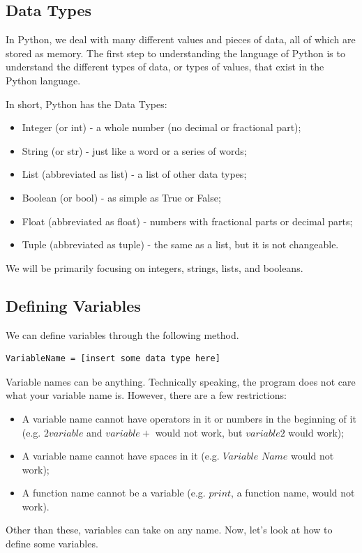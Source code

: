 \documentclass{article}
\begin{document}
\subsection{Data Types}
In Python, we deal with many different values and pieces of data, all of which are stored as memory. The first step to understanding the language of Python is to understand the different types of data, or types of values, that exist in the Python language. 

In short, Python has the Data Types:
\begin{itemize}
    \item Integer (or int) - a whole number (no decimal or fractional part);
    \item String (or str) - just like a word or a series of words;
    \item List (abbreviated as list) - a list of other data types;
    \item Boolean (or bool) - as simple as True or False;
    \item Float (abbreviated as float) - numbers with fractional parts or decimal parts;
    \item Tuple (abbreviated as tuple) - the same as a list, but it is not changeable.
\end{itemize}
We will be primarily focusing on integers, strings, lists, and booleans.
\subsection{Defining Variables}
We can define variables through the following method. 
\begin{lstlisting}
VariableName = [insert some data type here]
\end{lstlisting}
Variable names can be anything. Technically speaking, the program does not care what your variable name is. However, there are a few restrictions:

\begin{itemize}
    \item A variable name cannot have operators in it or numbers in the beginning of it (e.g. $2variable$ and $variable+$ would not work, but $variable2$ would work);
    \item A variable name cannot have spaces in it (e.g. $Variable$ $Name$ would not work);
    \item A function name cannot be a variable (e.g. $print$, a function name, would not work).
\end{itemize}
Other than these, variables can take on any name. Now, let's look at how to define some variables. 
\end{document}
